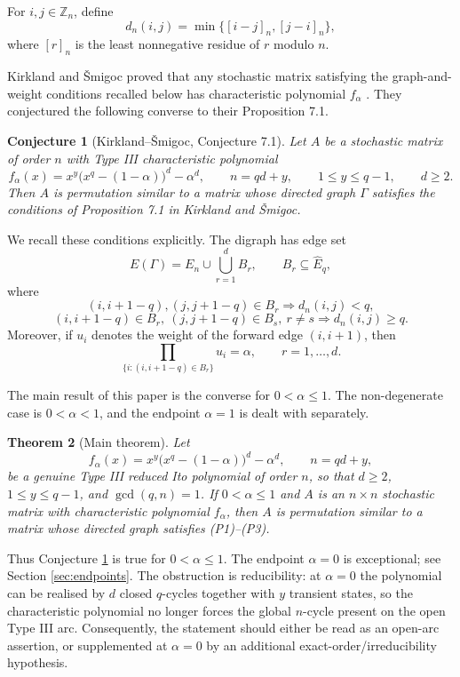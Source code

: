 \documentclass[11pt]{article}
\numberwithin{equation}{section}
\newtheorem{theorem}{Theorem}[section]
\newtheorem{conjecture}[theorem]{Conjecture}
\newcommand{\Zn}{\mathbb Z_n}
\newcommand{\Ehat}{\widehat E_q}
\begin{document}
For $i,j\in\Zn$, define
\[
        d_n(i,j)=\min\{[i-j]_n,[j-i]_n\},
\]
where $[r]_n$ is the least nonnegative residue of $r$ modulo $n$.

Kirkland and \v{S}migoc proved that any stochastic matrix satisfying the
graph-and-weight conditions recalled below has characteristic polynomial
$f_\alpha$ \cite[Proposition 7.1]{KirklandSmigoc}. They conjectured the
following converse to their Proposition 7.1.

\begin{conjecture}[Kirkland--\v{S}migoc, Conjecture 7.1]\label{conj:KS}
Let $A$ be a stochastic matrix of order $n$ with Type III characteristic
polynomial
\[
        f_\alpha(x)=x^y\bigl(x^q-(1-\alpha)\bigr)^d-\alpha^d,
        \qquad n=qd+y,
        \qquad 1\le y\le q-1,
        \qquad d\ge2.
\]
Then $A$ is permutation similar to a matrix whose directed graph $\Gamma$
satisfies the conditions of Proposition 7.1 in Kirkland and \v{S}migoc.
\end{conjecture}

We recall these conditions explicitly. The digraph has edge set
\[
        E(\Gamma)=E_n\cup\bigcup_{r=1}^d B_r,
        \qquad B_r\subseteq\Ehat,
\]
where
\[
        (i,i+1-q),(j,j+1-q)\in B_r
        \Longrightarrow d_n(i,j)<q, \tag{P1}
\]
\[
        (i,i+1-q)\in B_r,\ (j,j+1-q)\in B_s,\ r\ne s
        \Longrightarrow d_n(i,j)\ge q. \tag{P2}
\]
Moreover, if $u_i$ denotes the weight of the forward edge $(i,i+1)$, then
\[
        \prod_{\{i:(i,i+1-q)\in B_r\}}u_i=\alpha,
        \qquad r=1,\ldots,d. \tag{P3}
\]

The main result of this paper is the converse for $0<\alpha\le1$. The
non-degenerate case is $0<\alpha<1$, and the endpoint $\alpha=1$ is dealt with
separately.

\begin{theorem}[Main theorem]\label{thm:main}
Let
\[
        f_\alpha(x)=x^y\bigl(x^q-(1-\alpha)\bigr)^d-\alpha^d,
        \qquad n=qd+y,
\]
be a genuine Type III reduced Ito polynomial of order $n$, so that $d\ge2$,
$1\le y\le q-1$, and $\gcd(q,n)=1$. If $0<\alpha\le1$ and $A$ is an
$n\times n$ stochastic matrix with characteristic polynomial $f_\alpha$, then
$A$ is permutation similar to a matrix whose directed graph satisfies
(P1)--(P3).
\end{theorem}

Thus Conjecture \ref{conj:KS} is true for $0<\alpha\le1$. The endpoint
$\alpha=0$ is exceptional; see Section \ref{sec:endpoints}. The obstruction is
reducibility: at $\alpha=0$ the polynomial can be realised by $d$ closed
$q$-cycles together with $y$ transient states, so the characteristic polynomial
no longer forces the global $n$-cycle present on the open Type III arc.
Consequently, the statement should either be read as an open-arc assertion, or
supplemented at $\alpha=0$ by an additional exact-order/irreducibility
hypothesis.
\end{document}
